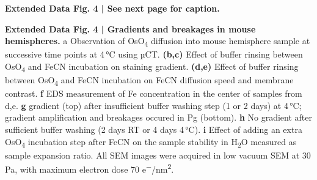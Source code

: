 \documentclass{article}
\begin{document}
\textbf{Extended Data Fig. 4 | See next page for caption.}

\textbf{Extended Data Fig. 4 | Gradients and breakages in mouse hemispheres.} a Observation of OsO\textsubscript{4} diffusion into mouse hemisphere sample at successive time points at 4\,°C using µCT. \textbf{(b,c)} Effect of buffer rinsing between OsO\textsubscript{4} and FeCN incubation on staining gradient. \textbf{(d,e)} Effect of buffer rinsing between OsO\textsubscript{4} and FeCN incubation on FeCN diffusion speed and membrane contrast. \textbf{f} EDS measurement of Fe concentration in the center of samples from d,e. \textbf{g} gradient (top) after insufficient buffer washing step (1 or 2 days) at 4\,°C; gradient amplification and breakages occured in Pg (bottom). \textbf{h} No gradient after sufficient buffer washing (2 days RT or 4 days 4\,°C). \textbf{i} Effect of adding an extra OsO\textsubscript{4} incubation step after FeCN on the sample stability in H\textsubscript{2}O measured as sample expansion ratio. All SEM images were acquired in low vacuum SEM at 30\,Pa, with maximum electron dose 70 e\textsuperscript{−}/nm\textsuperscript{2}.
\end{document}
